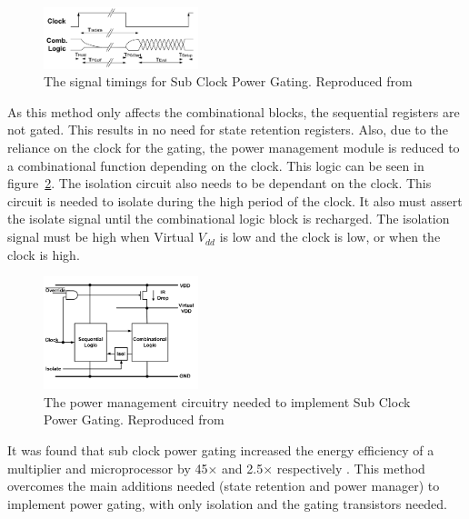 \begin{figure}
\includegraphics[width=0.4\textwidth]{Figures/scpg_timings.png}
\caption{The signal timings for Sub Clock Power Gating. Reproduced from \cite{mistry2011sub}}
\label{fig:scpg:timing}
\end{figure}


As this method only affects the combinational blocks, the sequential registers are not gated.
This results in no need for state retention registers.
Also, due to the reliance on the clock for the gating, the power management module is reduced to a combinational function depending on the clock. 
This logic can be seen in figure~\ref{fig:scpg:gate}. 
The isolation circuit also needs to be dependant on the clock.
This circuit is needed to isolate during the high period of the clock. 
It also must assert the isolate signal until the combinational logic block is recharged. 
The isolation signal must be high when Virtual $V_{dd}$ is low and the clock is low, or when the clock is high. 


\begin{figure}
\includegraphics[width=0.4\textwidth]{Figures/scpg_circuit.png}
\caption{The power management circuitry needed to implement Sub Clock Power Gating. Reproduced from \cite{mistry2011sub}}
\label{fig:scpg:gate}
\end{figure}

It was found that sub clock power gating increased the energy efficiency of a multiplier and microprocessor by 45$\times$ and 2.5$\times$ respectively \cite{mistry2011sub}.
This method overcomes the main additions needed (state retention and power manager) to implement power gating, with only isolation and the gating transistors needed. 

